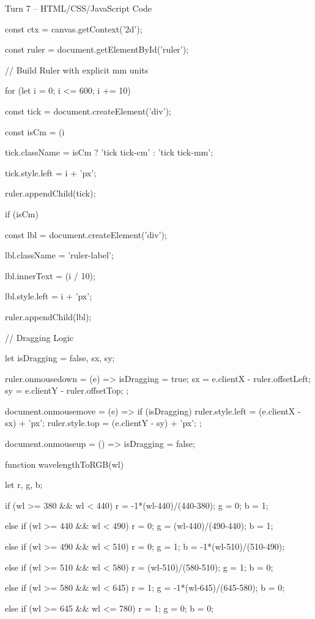 \documentclass[10pt,a4paper]{article}
\begin{document}
\begin{htmlcodebox}{Turn 7 -- HTML/CSS/JavaScript Code}
{{{{{const ctx = canvas.getContext('2d');

const ruler = document.getElementById('ruler');

// Build Ruler with explicit mm units

for (let i = 0; i <= 600; i += 10) {

    const tick = document.createElement('div');

    const isCm = (i %

    tick.className = isCm ? 'tick tick-cm' : 'tick tick-mm';

    tick.style.left = i + 'px';

    ruler.appendChild(tick);

    if (isCm) {

        const lbl = document.createElement('div');

        lbl.className = 'ruler-label';

        lbl.innerText = (i / 10);

        lbl.style.left = i + 'px';

        ruler.appendChild(lbl);

    }

}

// Dragging Logic

let isDragging = false, sx, sy;


ruler.onmousedown = (e) => { isDragging = true; sx = e.clientX - ruler.offsetLeft; sy = e.clientY - ruler.offsetTop; };

document.onmousemove = (e) => { if (isDragging) { ruler.style.left = (e.clientX - sx) + 'px'; ruler.style.top = (e.clientY - sy) + 'px'; } };

document.onmouseup = () => isDragging = false;

function wavelengthToRGB(wl) {

    let r, g, b;

    if (wl >= 380 && wl < 440) { r = -1*(wl-440)/(440-380); g = 0; b = 1; }

    else if (wl >= 440 && wl < 490) { r = 0; g = (wl-440)/(490-440); b = 1; }

    else if (wl >= 490 && wl < 510) { r = 0; g = 1; b = -1*(wl-510)/(510-490); }

    else if (wl >= 510 && wl < 580) { r = (wl-510)/(580-510); g = 1; b = 0; }

    else if (wl >= 580 && wl < 645) { r = 1; g = -1*(wl-645)/(645-580); b = 0; }

    else if (wl >= 645 && wl <= 780) { r = 1; g = 0; b = 0; }

}}}}}}
\end{htmlcodebox}
\end{document}
